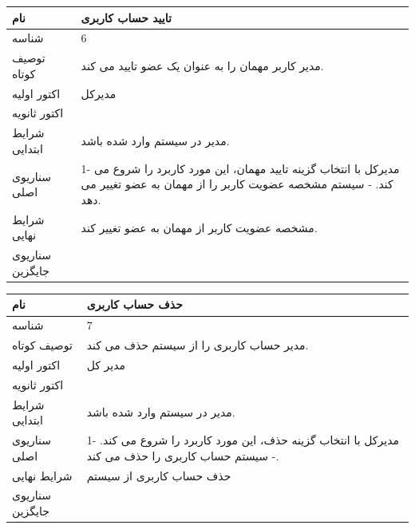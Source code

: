 \documentclass{article}
\begin{document}
\begin{tabular}{|p{2cm}|p{10cm}|}
\hline
نام
&
تایید حساب کاربری
\\
\hline
شناسه
&
6
\\
\hline
توصیف کوتاه
&
مدیر کاربر مهمان را به عنوان یک عضو تایید می کند.
\\
\hline
اکتور اولیه
&
مدیرکل
\\
\hline
اکتور ثانویه
&

\\
\hline
شرایط ابتدایی
&
مدیر در سیستم وارد شده باشد.
\\
\hline
سناریوی اصلی
&
1-	مدیرکل با انتخاب گزینه تایید مهمان، این مورد کاربرد را شروع می کند.
\newline
2-	سیستم مشخصه عضویت کاربر را از مهمان به عضو تغییر می دهد.
\\
\hline
شرایط نهایی
&
مشخصه عضویت کاربر از مهمان به عضو تغییر کند.
\\
\hline
سناریوی جایگزین
&

\\
\hline
\end{tabular}

\vspace{2cm}


\begin{tabular}{|p{2cm}|p{10cm}|}
\hline
نام
&
حذف حساب کاربری
\\
\hline
شناسه
&
7
\\
\hline
توصیف کوتاه
&
مدیر حساب کاربری را از سیستم حذف می کند.
\\
\hline
اکتور اولیه
&
مدیر کل
\\
\hline
اکتور ثانویه
&

\\
\hline
شرایط ابتدایی
&
مدیر در سیستم وارد شده باشد.
\\
\hline
سناریوی اصلی
&
1-	مدیرکل با انتخاب گزینه حذف، این مورد کاربرد را شروع می کند.
\newline
2-	سیستم حساب کاربری را حذف می کند.
\\
\hline
شرایط نهایی
&
حذف حساب کاربری از سیستم
\\
\hline
سناریوی جایگزین
&

\\
\hline
\end{tabular}

\vspace{2cm}
\end{document}
